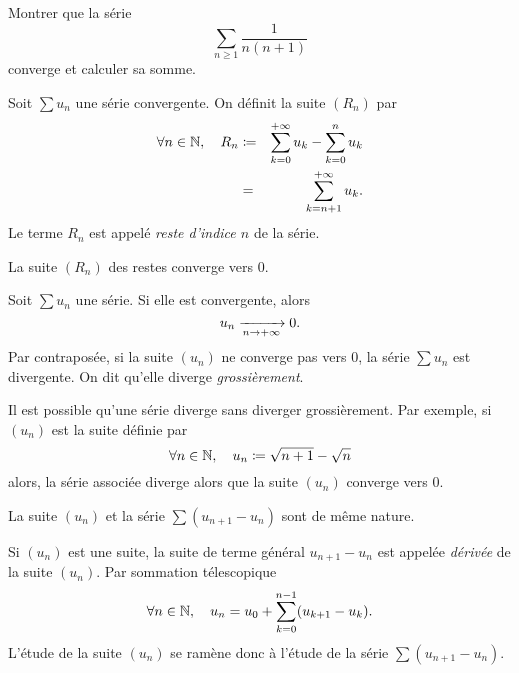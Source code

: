 \documentclass{magnolia}
\begin{document}

\begin{exoUnique}
\exo Montrer que la série
  \[\sum_{n\geq 1} \frac{1}{n(n+1)}\]
  converge et calculer sa somme.
\end{exoUnique}


\begin{definition}
Soit $\sum u_n$ une série convergente. On définit la suite $(R_n)$ par
\begin{eqnarray*}
\forall n\in\mathbb{N},\quad R_n &\coloneqq& \sum_{k=0}^{+\infty} u_k - \sum_{k=0}^n u_k\\
&=& \sum_{k=n+1}^{+\infty} u_k.
\end{eqnarray*}
Le terme $R_n$ est appelé \emph{reste d'indice $n$} de la série.
\end{definition}

\begin{remarqueUnique}
\remarque La suite $(R_n)$ des restes converge vers 0.
\end{remarqueUnique}

\begin{proposition}
Soit $\sum u_n$ une série. Si elle est convergente, alors
\[u_n\xrightarrow[n\rightarrow +\infty]{}0.\]
Par contraposée, si la suite $(u_n)$ ne converge pas vers 0, la série $\sum u_n$ est
divergente. On dit qu'elle diverge \emph{grossièrement}.
\end{proposition}

\begin{remarqueUnique}
\remarque Il est possible qu'une série diverge sans diverger grossièrement.
  Par exemple, si $(u_n)$ est la suite définie par
  \[\forall n\in\mathbb{N},\quad u_n\coloneqq\sqrt{n+1}-\sqrt{n}\]
  alors, la série associée diverge alors que la suite $(u_n)$ converge vers 0.
\end{remarqueUnique}

\begin{proposition}
La suite $(u_n)$ et la série $\sum (u_{n+1}-u_n)$ sont de même nature.
\end{proposition}

\begin{remarqueUnique}
\remarque Si $(u_n)$ est une suite, la suite de terme général $u_{n+1}-u_n$ est appelée
  \emph{dérivée} de la suite $(u_n)$. Par sommation télescopique
  \[\forall n\in\mathbb{N},\quad u_n=u_0 + \sum_{k=0}^{n-1} (u_{k+1}-u_k).\]
  L'étude de la suite $(u_n)$ se ramène donc à l'étude de la série
  $\sum (u_{n+1}-u_n)$.
\end{remarqueUnique}
\end{document}
